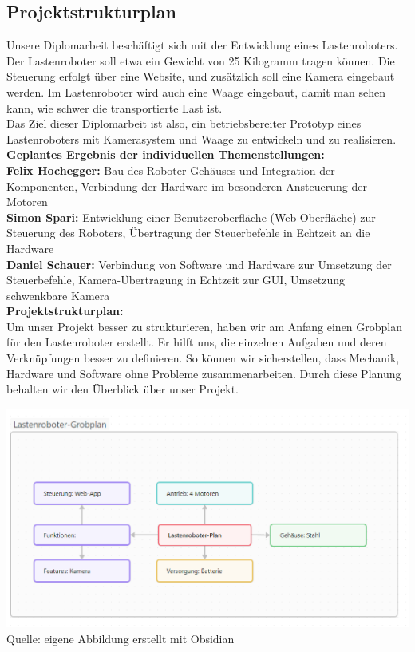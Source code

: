 \documentclass[ngerman,12pt,a4paper]{article}
\begin{document}
		\subsection{Projektstrukturplan} %
		Unsere Diplomarbeit beschäftigt sich mit der Entwicklung eines Lastenroboters. Der Lastenroboter soll etwa ein Gewicht von 25 Kilogramm tragen können. Die Steuerung erfolgt über eine Website, und zusätzlich soll eine Kamera eingebaut werden. Im Lastenroboter wird auch eine Waage eingebaut, damit man sehen kann, wie schwer die transportierte Last ist. \\ Das Ziel dieser Diplomarbeit ist also, ein betriebsbereiter Prototyp eines Lastenroboters mit Kamerasystem und Waage zu entwickeln und zu realisieren. \\[0.4cm]
		\textbf{Geplantes Ergebnis der individuellen Themenstellungen:} \\
		\textbf{Felix Hochegger:}
		Bau des Roboter-Gehäuses und Integration der Komponenten, Verbindung der Hardware im besonderen Ansteuerung der Motoren \\
		\textbf{Simon Spari:}
		Entwicklung einer Benutzeroberfläche (Web-Oberfläche) zur Steuerung des Roboters, Übertragung der Steuerbefehle in Echtzeit an die Hardware \\
		\textbf{Daniel Schauer:}
		Verbindung von Software und Hardware zur Umsetzung der Steuerbefehle, Kamera-Übertragung in Echtzeit zur GUI, Umsetzung schwenkbare Kamera\\[0.4cm]
		\textbf{Projektstrukturplan:} \\
		Um unser Projekt besser zu strukturieren, haben wir am Anfang einen Grobplan für den Lastenroboter erstellt. Er hilft uns, die einzelnen Aufgaben und deren Verknüpfungen besser zu definieren. So können wir sicherstellen, dass Mechanik, Hardware und Software ohne Probleme zusammenarbeiten. Durch diese Planung behalten wir den Überblick über unser Projekt.
		\begin{center}
			\begin{minipage}{\textwidth}
				\centering
				\includegraphics[scale=0.53]{Pictures/lastenroboter_grobplan}
				\label{fig:projekt_grobplan}
				\vspace{-4pt}
				{\small Quelle: eigene Abbildung erstellt mit Obsidian}
			\end{minipage}
		\end{center}
\end{document}
